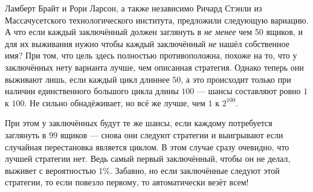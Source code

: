 Ламберт Брайт и Рори Ларсон, а также независимо Ричард Стэнли из Массачусетского технологического института, предложили следующую вариацию.
А что если каждый заключённый должен заглянуть в \emph{не менее} чем 50 ящиков, и для их выживания нужно чтобы каждый заключённый \emph{не} нашёл собственное имя?
При том, что цель здесь полностью противоположна, похоже на то, что у заключённых нету варианта лучше, чем описанная стратегия.
Однако теперь они выживают лишь, если каждый цикл длиннее $50$, а это происходит только при наличии единственного большого цикла длины $100$ --- шансы составляют ровно $1$ к $100$.
Не сильно обнадёживает, но всё же лучше, чем $1$ к $2^{100}$.

При этом у заключённых будут те же шансы, если каждому потребуется заглянуть в $99$ ящиков --- снова они следуют стратегии и выигрывают если случайная перестановка является циклом.
В этом случае сразу очевидно, что лучшей стратегии нет.
Ведь самый первый заключённый, чтобы он не делал, выживет с вероятностью $1\%$.
Забавно, но если заключённые следуют этой стратегии, то если повезло первому, то автоматически везёт всем!
